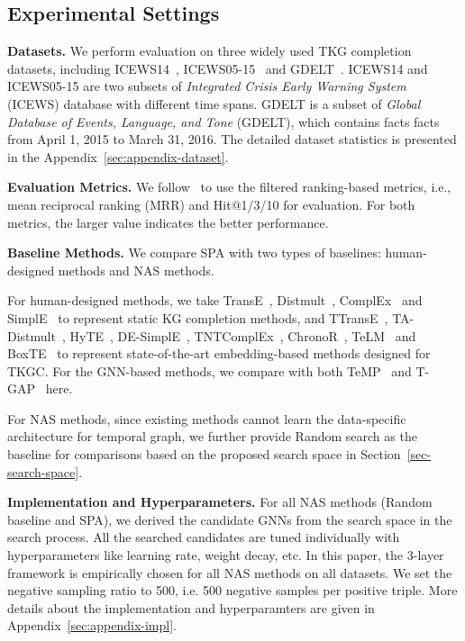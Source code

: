 \documentclass[11pt]{article}
\begin{document}
\subsection{Experimental Settings}

\noindent\textbf{Datasets.} We perform evaluation on three widely used TKG completion datasets, including ICEWS14~\citep{garcia-duran-etal-2018-learning}, ICEWS05-15~\citep{garcia-duran-etal-2018-learning} and GDELT~\citep{leetaru2013gdelt}.
ICEWS14 and ICEWS05-15 are two subsets of \textit{Integrated Crisis Early Warning System} (ICEWS) database with different time spans.
GDELT is a subset of \textit{Global Database of Events, Language, and Tone} (GDELT), 
which contains facts facts from April 1, 2015 to March 31, 2016.
The detailed dataset statistics is presented in the Appendix~\ref{sec:appendix-dataset}.

\noindent\textbf{Evaluation Metrics.} We follow~\citep{bordes2013translating} to use the filtered ranking-based metrics, i.e., mean reciprocal ranking (MRR) and Hit@1/3/10 for evaluation.
For both metrics, 
the larger value indicates the better performance.

\noindent\textbf{Baseline Methods.} We compare SPA with two types of baselines: human-designed methods and NAS methods. 

For human-designed methods, 
we take TransE~\citep{bordes2013translating}, 
Distmult~\citep{yang2015embedding}, 
ComplEx~\citep{trouillon2016complex} and SimplE~\citep{kazemi2018simple} to represent static KG completion methods, and TTransE~\citep{leblay2018deriving}, 
TA-Distmult~\citep{garcia-duran-etal-2018-learning}, 
HyTE~\citep{dasgupta-etal-2018-hyte}, 
DE-SimplE~\citep{goel2020diachronic}, 
TNTComplEx~\citep{lacroix2020tensor}, 
ChronoR~\cite{sadeghian2021chronor}, 
TeLM~\citep{xu2021temporal} and
BoxTE~\citep{messner2022temporal} to represent state-of-the-art embedding-based methods designed for TKGC.
For the GNN-based methods, 
we compare with both TeMP~\citep{wu-etal-2020-temp} and T-GAP~\citep{jung2021learning} here.

For NAS methods, 
since existing methods cannot learn the data-specific architecture for temporal graph, 
we further provide Random search as the baseline for comparisons based on the proposed search space in Section~\ref{sec-search-space}.

\noindent\textbf{Implementation and Hyperparameters.} For all NAS methods (Random baseline and SPA), 
we derived the candidate GNNs from the search space in the search process. 
All the searched candidates are tuned individually with hyperparameters like learning rate, weight decay, etc.
In this paper, 
the 3-layer framework is empirically chosen for all NAS methods on all datasets.
We set the negative sampling ratio to 500, i.e. 500 negative samples per positive triple.
More details about the implementation and hyperparamters are given in Appendix~\ref{sec:appendix-impl}.
\end{document}
